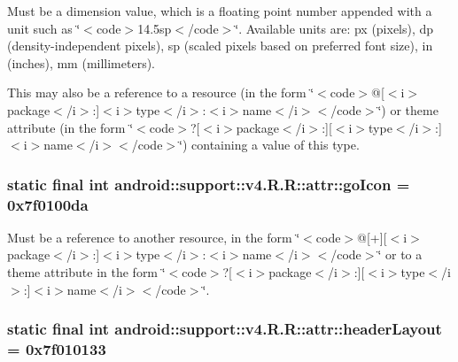 Must be a dimension value, which is a floating point number appended with a unit such as \char`\"{}$<$code$>$14.5sp$<$/code$>$\char`\"{}. Available units are: px (pixels), dp (density-independent pixels), sp (scaled pixels based on preferred font size), in (inches), mm (millimeters). 

This may also be a reference to a resource (in the form \char`\"{}$<$code$>$@\mbox{[}$<$i$>$package$<$/i$>$:\mbox{]}$<$i$>$type$<$/i$>$:$<$i$>$name$<$/i$>$$<$/code$>$\char`\"{}) or theme attribute (in the form \char`\"{}$<$code$>$?\mbox{[}$<$i$>$package$<$/i$>$:\mbox{]}\mbox{[}$<$i$>$type$<$/i$>$:\mbox{]}$<$i$>$name$<$/i$>$$<$/code$>$\char`\"{}) containing a value of this type. \hypertarget{classandroid_1_1support_1_1v4_1_1_r_1_1attr_b459b88d28bea5ee88e533a6120a06e0}{
\subsubsection[{goIcon}]{\setlength{\rightskip}{0pt plus 5cm}static final int android::support::v4.R.R::attr::goIcon = 0x7f0100da}}
\label{classandroid_1_1support_1_1v4_1_1_r_1_1attr_b459b88d28bea5ee88e533a6120a06e0}


Must be a reference to another resource, in the form \char`\"{}$<$code$>$@\mbox{[}+\mbox{]}\mbox{[}$<$i$>$package$<$/i$>$:\mbox{]}$<$i$>$type$<$/i$>$:$<$i$>$name$<$/i$>$$<$/code$>$\char`\"{} or to a theme attribute in the form \char`\"{}$<$code$>$?\mbox{[}$<$i$>$package$<$/i$>$:\mbox{]}\mbox{[}$<$i$>$type$<$/i$>$:\mbox{]}$<$i$>$name$<$/i$>$$<$/code$>$\char`\"{}. \hypertarget{classandroid_1_1support_1_1v4_1_1_r_1_1attr_3e502de33ed3bc0aa35df547b0de9f71}{
\subsubsection[{headerLayout}]{\setlength{\rightskip}{0pt plus 5cm}static final int android::support::v4.R.R::attr::headerLayout = 0x7f010133}}
\label{classandroid_1_1support_1_1v4_1_1_r_1_1attr_3e502de33ed3bc0aa35df547b0de9f71}


